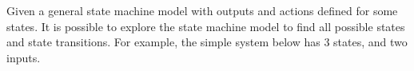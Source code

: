 Given a general state machine model with outputs and actions defined for some states.
It is possible to explore the state machine model to find all possible states and state transitions.
For example, the simple system below has 3 states, and two inputs.
